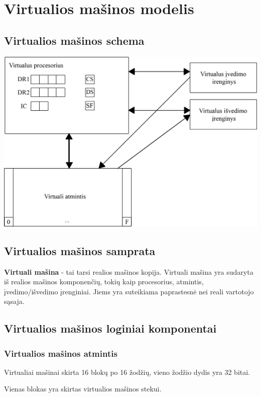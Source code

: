 \section{Virtualios mašinos modelis}
	\subsection{Virtualios mašinos schema}
	\includegraphics{kita/VM15new.png}
	\subsection{Virtualios mašinos samprata}
	\textbf{Virtuali mašina} - tai tarsi realios mašinos kopija. Virtuali mašina yra sudaryta iš realios mašinos komponenčių, tokių kaip procesorius, atmintis, įvedimo/išvedimo įrenginiai. Jiems yra suteikiama paprastesnė nei reali vartotojo sąsaja.
	
	\subsection{Virtualios mašinos loginiai komponentai}
	\subsubsection{Virtualios mašinos atmintis}
	Virtualiai mašinai skirta 16 blokų po 16 žodžių, vieno žodžio dydis yra 32 bitai.
	
	Vienas blokas yra skirtas virtualios mašinos stekui.
